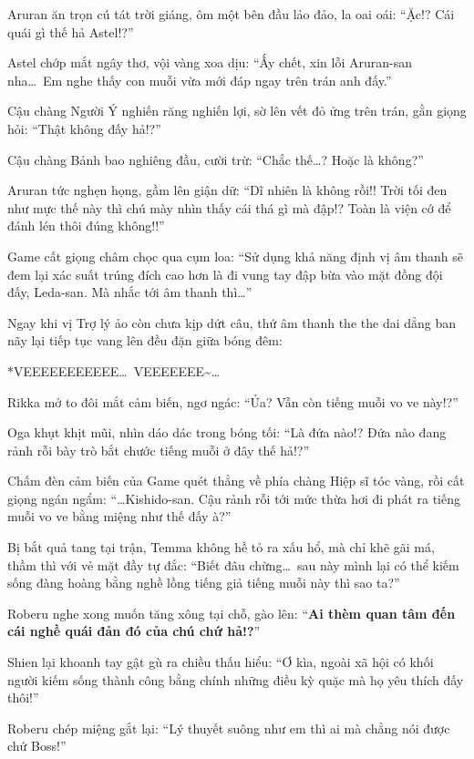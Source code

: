 \documentclass[../main.tex]{subfiles}
\begin{document}
Aruran ăn trọn cú tát trời giáng, ôm một bên đầu lảo đảo, la oai oái: ``Ặc!? Cái quái gì thế hả Astel!?''

Astel chớp mắt ngây thơ, vội vàng xoa dịu: ``Ấy chết, xin lỗi Aruran-san nha\dots\ Em nghe thấy con muỗi vừa mới đáp ngay trên trán anh đấy.''

Cậu chàng Người Ý nghiến răng nghiến lợi, sờ lên vết đỏ ửng trên trán, gằn giọng hỏi: ``Thật không đấy hả!?''

Cậu chàng Bảnh bao nghiêng đầu, cười trừ: ``Chắc thế\dots? Hoặc là không?''

Aruran tức nghẹn họng, gầm lên giận dữ: ``Dĩ nhiên là không rồi!! Trời tối đen như mực thế này thì chú mày nhìn thấy cái thá gì mà đập!? Toàn là viện cớ để đánh lén thôi đúng không!!''

Game cất giọng châm chọc qua cụm loa: ``Sử dụng khả năng định vị âm thanh sẽ đem lại xác suất trúng đích cao hơn là đi vung tay đập bừa vào mặt đồng đội đấy, Leda-san. Mà nhắc tới âm thanh thì\dots''

Ngay khi vị Trợ lý ảo còn chưa kịp dứt câu, thứ âm thanh the the dai dẳng ban nãy lại tiếp tục vang lên đều đặn giữa bóng đêm:

*VEEEEEEEEEEE\dots\ VEEEEEEE\~{}\dots*

Rikka mở to đôi mắt cảm biến, ngơ ngác: ``Ủa? Vẫn còn tiếng muỗi vo ve này!?''

Oga khụt khịt mũi, nhìn dáo dác trong bóng tối: ``Là đứa nào!? Đứa nào đang rảnh rỗi bày trò bắt chước tiếng muỗi ở đây thế hả!?''

Chấm đèn cảm biến của Game quét thẳng về phía chàng Hiệp sĩ tóc vàng, rồi cất giọng ngán ngẩm: ``\dots Kishido-san. Cậu rảnh rỗi tới mức thừa hơi đi phát ra tiếng muỗi vo ve bằng miệng như thế đấy à?''

Bị bắt quả tang tại trận, Temma không hề tỏ ra xấu hổ, mà chỉ khẽ gãi má, thầm thì với vẻ mặt đầy tự đắc: ``Biết đâu chừng\dots\ sau này mình lại có thể kiếm sống đàng hoàng bằng nghề lồng tiếng giả tiếng muỗi này thì sao ta?''

Roberu nghe xong muốn tăng xông tại chỗ, gào lên: ``\textbf{Ai thèm quan tâm đến cái nghề quái đản đó của chú chứ hả!?}''

Shien lại khoanh tay gật gù ra chiều thấu hiểu: ``Ơ kìa, ngoài xã hội có khối người kiếm sống thành công bằng chính những điều kỳ quặc mà họ yêu thích đấy thôi!''

Roberu chép miệng gắt lại: ``Lý thuyết suông như em thì ai mà chẳng nói được chứ Boss!''
\end{document}
